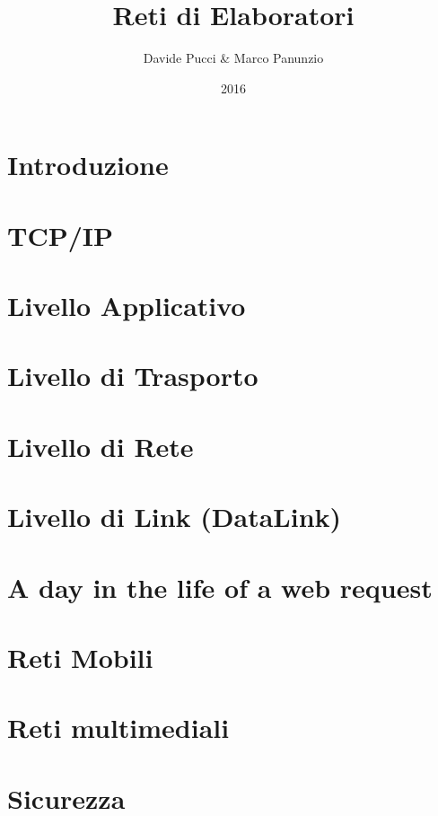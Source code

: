 

\title{Reti di Elaboratori}
\author{Davide Pucci \& Marco Panunzio}
\date{2016}



\maketitle

\tableofcontents

\chapter{Introduzione}


\chapter{TCP/IP}


\chapter{Livello Applicativo}


\chapter{Livello di Trasporto}


\chapter{Livello di Rete}


\chapter{Livello di Link (DataLink)}


\chapter{A day in the life of a web request}


\chapter{Reti Mobili}


\chapter{Reti multimediali}


\chapter{Sicurezza}


